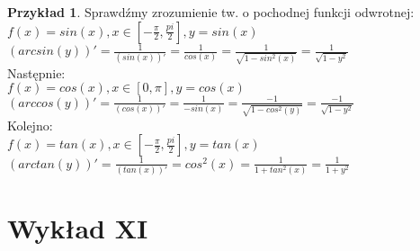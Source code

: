 \documentclass{article}
\theoremstyle{definition}
\theoremstyle{definition}
\theoremstyle{definition}
\newtheorem{pk}{Przykład}[subsection]
\theoremstyle{definition}
\begin{document}
\begin{pk}
    Sprawdźmy zrozumienie tw. o pochodnej funkcji odwrotnej:\\
    $f(x)=sin(x), x\in[-\frac{\pi}{2},\frac{pi}{2}], y=sin(x)$\\
    $\left(arcsin(y)\right)'=\frac{1}{(sin(x))'} = \frac{1}{cos(x)}=\frac{1}{\sqrt{1-sin^2(x)}}=\frac{1}{\sqrt{1-y^2}}$\\
    Następnie:\\
    $f(x)=cos(x), x\in[0,\pi], y=cos(x)$\\
    $\left(arccos(y)\right)'=\frac{1}{(cos(x))'} = \frac{1}{-sin(x)} = \frac{-1}{\sqrt{1-cos^2(y)}}=\frac{-1}{\sqrt{1-y^2}}$\\
    Kolejno:\\
    $f(x)=tan(x), x\in[-\frac{\pi}{2},\frac{pi}{2}], y=tan(x)$\\
    $\left(arctan(y)\right)'=\frac{1}{(tan(x))'}=cos^2(x)=\frac{1}{1+tan^2(x)}=\frac{1}{1+y^2}$
\end{pk}

\section{Wykład XI}
\end{document}
